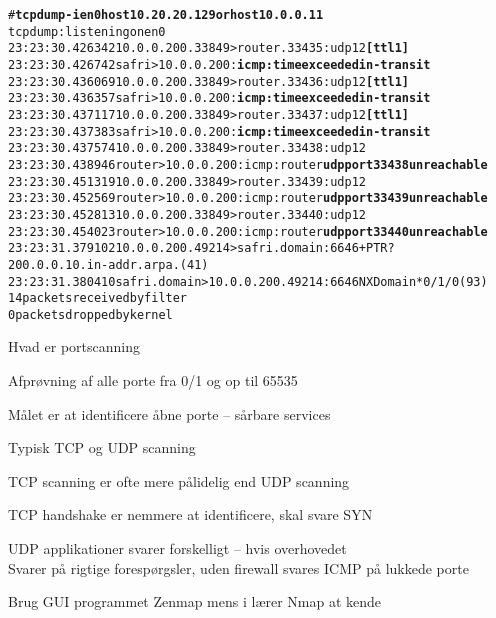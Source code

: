 \documentclass[Screen16to9,17pt]{foils}
\begin{document}

\begin{alltt}
\footnotesize # {\bfseries tcpdump -i en0 host 10.20.20.129 or host 10.0.0.11}
tcpdump: listening on en0
23:23:30.426342 10.0.0.200.33849 > router.33435: udp 12 {\bf [ttl 1]}
23:23:30.426742 safri > 10.0.0.200: {\bf icmp: time exceeded in-transit}
23:23:30.436069 10.0.0.200.33849 > router.33436: udp 12 {\bf [ttl 1]}
23:23:30.436357 safri > 10.0.0.200: {\bf icmp: time exceeded in-transit}
23:23:30.437117 10.0.0.200.33849 > router.33437: udp 12 {\bf [ttl 1]}
23:23:30.437383 safri > 10.0.0.200: {\bf icmp: time exceeded in-transit}
23:23:30.437574 10.0.0.200.33849 > router.33438: udp 12
23:23:30.438946 router > 10.0.0.200: icmp: router {\bf udp port 33438 unreachable}
23:23:30.451319 10.0.0.200.33849 > router.33439: udp 12
23:23:30.452569 router > 10.0.0.200: icmp: router {\bf udp port 33439 unreachable}
23:23:30.452813 10.0.0.200.33849 > router.33440: udp 12
23:23:30.454023 router > 10.0.0.200: icmp: router {\bf udp port 33440 unreachable}
23:23:31.379102 10.0.0.200.49214 > safri.domain:  6646+ PTR?
200.0.0.10.in-addr.arpa. (41)
23:23:31.380410 safri.domain > 10.0.0.200.49214:  6646 NXDomain* 0/1/0 (93)
14 packets received by filter
0 packets dropped by kernel
\end{alltt}



\begin{list1}
\item Hvad er portscanning
\item Afprøvning af alle porte fra 0/1 og op til 65535
\item Målet er at identificere åbne porte -- sårbare services
\item Typisk TCP og UDP scanning
\item TCP scanning er ofte mere pålidelig end UDP scanning
\item TCP handshake er nemmere at identificere, skal svare SYN
\item UDP applikationer svarer forskelligt -- hvis overhovedet\\
Svarer på rigtige forespørgsler, uden firewall svares ICMP på lukkede porte
\item Brug GUI programmet Zenmap mens i lærer Nmap at kende
\end{list1}



\end{document}
